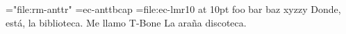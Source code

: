 \ifdefined\directlua \fi
\font\antykwatorunska="file:rm-anttr"
\font\antykwatorunskabcap=ec-anttbcap
\font\lmromanten={file:ec-lmr10} at 10pt
\antykwatorunska foo bar
\antykwatorunskabcap baz xyzzy 
\lmromanten Donde, está, la biblioteca. Me llamo T-Bone La araña discoteca.
\bye
